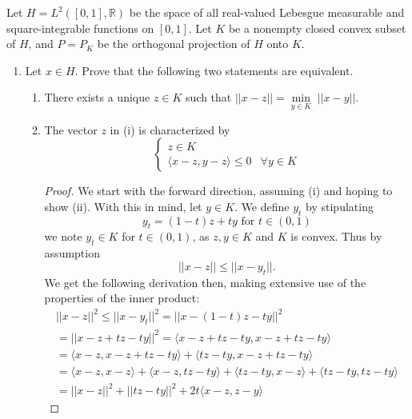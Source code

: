 \documentclass[12pt]{article}
\newenvironment{ex}[2][Exercise]{\begin{trivlist}
\item[\hskip \labelsep {\bfseries #1}\hskip \labelsep {\bfseries #2.}]}{\end{trivlist}}
\begin{document}
\begin{ex}{4}
    Let $H = L^2([0,1], \mathbb{R})$ be the space of all real-valued Lebesgue measurable and square-integrable functions on $[0,1]$. Let $K$ be a nonempty closed convex subset of $H$, and $P = P_K$ be the orthogonal projection of $H$ onto $K$.
    \begin{enumerate}[label=(\alph*)]
        \item Let $x \in H$. Prove that the following two statements are equivalent.
        \begin{enumerate}[label=(\roman*)]
            \item There exists a unique $z \in K$ such that $||x - z|| = \underset{y \in K}{\min} \; ||x - y||$. 
            \item The vector $z$ in (i) is characterized by
                \begin{equation*}
                \begin{cases}
                    z \in K \\
                    \langle x - z, y - z \rangle \leq 0 & \forall y \in K
                \end{cases}
                \end{equation*}
                \begin{proof}
                    We start with the forward direction, assuming (i) and hoping to show (ii). With this in mind, let $y \in K$. We define $y_t$ by stipulating
                    $$y_t = (1 - t)z + ty \text{ for } t \in (0,1)$$
                    we note $y_t \in K$ for $t \in (0,1)$, as $z, y \in K$ and $K$ is convex. Thus by assumption 
                    $$||x - z|| \leq ||x - y_t||.$$
                    We get the following derivation then, making extensive use of the properties of the inner product:
                    \begin{align*}
                        ||x - z||^2  \leq ||x - y_t||^2 
                        = ||x - (1 - t)z - ty||^2 \\
                        = ||x - z + tz - ty||^2 
                        = \langle x - z + tz - ty, x - z + tz - ty\rangle \\
                        = \langle x - z, x - z + tz - ty \rangle + \langle tz - ty, x - z + tz - ty \rangle \\
                        = \langle x - z, x - z \rangle + \langle x - z, tz - ty\rangle + \langle tz - ty, x - z \rangle + \langle tz - ty, tz - ty \rangle \\
                        = ||x - z||^2 + ||tz - ty||^2 + 2t\langle x - z, z - y \rangle

\end{align*}
\end{proof}
\end{enumerate}
\end{enumerate}
\end{ex}
\end{document}
